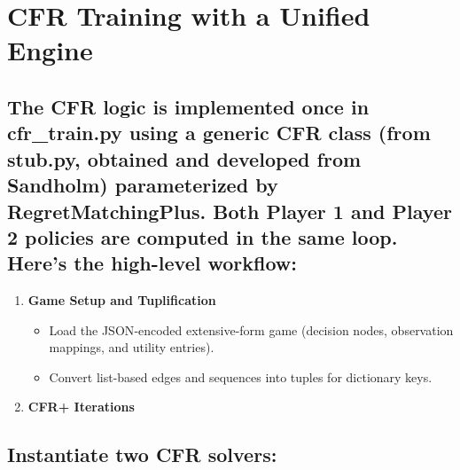 \documentclass[
]{article}
\begin{document}
\section*{\texorpdfstring{\textbf{CFR Training with a Unified
Engine}}{CFR Training with a Unified Engine}}\label{cfr-training-with-a-unified-engine}

\subsection*{\texorpdfstring{ The CFR logic is implemented once in
cfr\_train.py using a generic CFR class (from stub.py, obtained and
developed from Sandholm) parameterized by RegretMatchingPlus. Both
Player 1 and Player 2 policies are computed in the same loop. Here's the
high-level
workflow:}{ The CFR logic is implemented once in cfr\_train.py using a generic CFR class (from stub.py, obtained and developed from Sandholm) parameterized by RegretMatchingPlus. Both Player 1 and Player 2 policies are computed in the same loop. Here's the high-level workflow:}}\label{the-cfr-logic-is-implemented-once-in-cfr_train.py-using-a-generic-cfr-class-from-stub.py-obtained-and-developed-from-sandholm-parameterized-by-regretmatchingplus.-both-player-1-and-player-2-policies-are-computed-in-the-same-loop.-heres-the-high-level-workflow}

\begin{enumerate}
\def\labelenumi{\arabic{enumi}.}
\item
  \textbf{Game Setup and Tuplification}

  \begin{itemize}
  \item
    Load the JSON‑encoded extensive-form game (decision nodes,
    observation mappings, and utility entries).
  \item
    Convert list-based edges and sequences into tuples for dictionary
    keys.
  \end{itemize}
\item
  \textbf{CFR+ Iterations}
\end{enumerate}

\subsection{Instantiate two CFR
solvers:}\label{instantiate-two-cfr-solvers}
\end{document}
